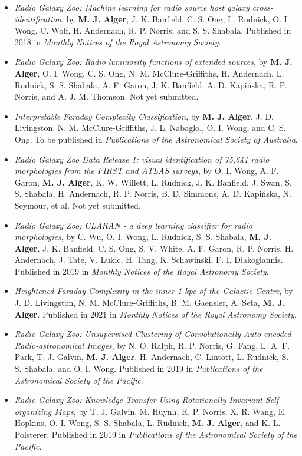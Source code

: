 \begin{itemize}
    \item \emph{Radio Galaxy Zoo: Machine learning for radio source host galaxy cross-identification}, by \textbf{M. J. Alger}, J. K. Banfield, C. S. Ong, L. Rudnick, O. I. Wong, C. Wolf, H. Andernach, R. P. Norris, and S. S. Shabala. Published in 2018 in \emph{Monthly Notices of the Royal Astronomy Society}.
    \item \emph{Radio Galaxy Zoo: Radio luminosity functions of extended sources}, by \textbf{M. J. Alger}, O. I. Wong, C. S. Ong, N. M. McClure-Griffiths, H. Andernach, L. Rudnick, S. S. Shabala, A. F. Garon, J. K. Banfield, A. D. Kapi\'nska, R. P. Norris, and A. J. M. Thomson. Not yet submitted.
    \item \emph{Interpretable Faraday Complexity Classification}, by \textbf{M. J. Alger}, J. D. Livingston, N. M. McClure-Griffiths, J. L. Nabaglo., O. I. Wong, and C. S. Ong. To be published in \emph{Publications of the Astronomical Society of Australia}.
    \item \emph{Radio Galaxy Zoo Data Release 1: visual identification of 75,641 radio morphologies from the FIRST and ATLAS surveys}, by O. I. Wong, A. F. Garon, \textbf{M. J. Alger}, K. W. Willett, L. Rudnick, J. K. Banfield, J. Swan, S. S. Shabala, H. Andernach, R. P. Norris, B. D. Simmons, A. D. Kapi\'nska, N. Seymour, et al. Not yet submitted.
    \item \emph{Radio Galaxy Zoo: CLARAN - a deep learning classifier for radio morphologies}, by C. Wu, O. I. Wong, L. Rudnick, S. S. Shabala, \textbf{M. J. Alger}, J. K. Banfield, C. S. Ong, S. V. White, A. F. Garon, R. P. Norris, H. Andernach, J. Tate, V. Lukic, H. Tang, K. Schawinski, F. I. Diakogiannis. Published in 2019 in \emph{Monthly Notices of the Royal Astronomy Society}.
    \item \emph{Heightened Faraday Complexity in the inner 1 kpc of the Galactic Centre}, by J. D. Livingston, N. M. McClure-Griffiths, B. M. Gaensler, A. Seta, \textbf{M. J. Alger}. Published in 2021 in \emph{Monthly Notices of the Royal Astronomy Society}.
    \item \emph{Radio Galaxy Zoo: Unsupervised Clustering of Convolutionally Auto-encoded Radio-astronomical Images}, by N. O. Ralph, R. P. Norris, G. Fang, L. A. F. Park, T. J. Galvin, \textbf{M. J. Alger}, H. Andernach, C. Lintott, L. Rudnick, S. S. Shabala, and O. I. Wong. Published in 2019 in \emph{Publications of the Astronomical Society of the Pacific}.
    \item \emph{Radio Galaxy Zoo: Knowledge Transfer Using Rotationally Invariant Self-organizing Maps}, by T. J. Galvin, M. Huynh, R. P. Norris, X. R. Wang, E. Hopkins, O. I. Wong, S. S. Shabala, L. Rudnick, \textbf{M. J. Alger}, and K. L. Polsterer. Published in 2019 in \emph{Publications of the Astronomical Society of the Pacific}.
\end{itemize}

